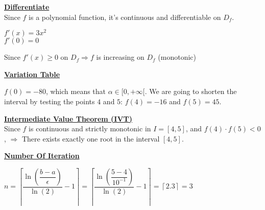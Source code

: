 \newpage
\textbf{\underline{Differentiate}}\\[0.2cm]
Since \(f\) is a polynomial function, it's continuous and differentiable on \(D_f\).

\vspace{0.35cm}
\begin{center}
\(f'(x) = 3x^2\)\\[0.3cm]
\(f'(0) = 0\)
\end{center}

\vspace{0.35cm}
Since \(f'(x) \geq 0\) on \(D_f \Rightarrow f\) is increasing on \(D_f\) (monotonic)

\vspace{1cm}

\textbf{\underline{Variation Table}}\\[0.25cm]

\begin{center}
\end{center}

\vspace{0.5cm}

\(f(0) = -80\), which means that \(\alpha \in [0,+\infty[\).  
We are going to shorten the interval by testing the points \(4\) and \(5\):  
\(f(4) = -16\) and \(f(5) = 45\).

\vspace{1cm}
\textbf{\underline{Intermediate Value Theorem (IVT)}}\\[0.25cm]
Since \(f\) is continuous and strictly monotonic in \(I = [4,5]\), and \(f(4) \cdot f(5) < 0\),  
\(\Rightarrow\) There exists exactly one root in the interval \([4,5]\).

\vspace{0.35cm}

\textbf{\underline{Number Of Iteration}}\\[0.25cm]

\begin{center}
\(n = \left\lceil \dfrac{\ln\left(\dfrac{b-a}{\epsilon}\right)}{\ln(2)} - 1 \right\rceil = \left\lceil \dfrac{\ln\left(\dfrac{5-4}{10^{-1}}\right)}{\ln(2)} - 1 \right\rceil = \boxed{\left\lceil 2.3 \right\rceil = 3}\)
\end{center}

